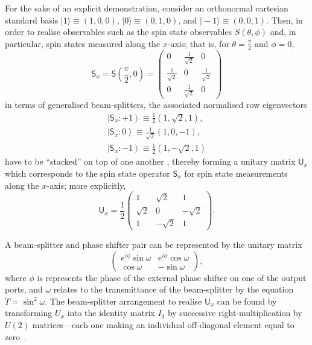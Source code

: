 \documentclass[%
 preprint,
 showpacs,
 showkeys,
 amsmath,
 amssymb,
 aps,
 pra,
 ]{revtex4-1}
\theoremstyle{definition}
\newcommand{\ket}[1]{\left| #1 \right>}
\begin{document}
For the sake of an explicit demonstration, consider an orthonormal cartesian standard basis
$\vert 1\rangle \equiv (1,0,0)$,
$\vert 0\rangle \equiv  (0,1,0)$, and
$\vert -1\rangle \equiv  (0,0,1)$.
Then, in order to realise observables such as the spin state observables
$S(\theta,\phi)$
and, in particular, spin states  measured along the $x$-axis;
that is, for $\theta = \frac{\pi}{2}$ and $\phi = 0$,
\begin{equation}
\textsf{S}_x   =
\textsf{S}\left(\frac{\pi}{2},0 \right)
=
\left(
\begin{array}{ccc}
 0 & \frac{1}{\sqrt{2}} & 0 \\
 \frac{1}{\sqrt{2}} & 0 & \frac{1}{\sqrt{2}} \\
 0 & \frac{1}{\sqrt{2}} & 0
\end{array}
\right)
\end{equation}
in terms of generalised beam-splitters, the
associated normalised row eigenvectors
\begin{equation}
\begin{array}{l}
 \ket{\textsf{S}_x : +1} \equiv  \frac{1}{2}\left(1,\sqrt{2},1\right),\\
 \ket{\textsf{S}_x : 0} \equiv  \frac{1}{\sqrt{2}}\left(1,0,-1\right),\\
 \ket{\textsf{S}_x : -1} \equiv  \frac{1}{2}\left(1,-\sqrt{2},1\right)
\end{array}
\end{equation}
have to be ``stacked'' on top of one another \cite{rzbb}, thereby forming a unitary matrix $\textsf{U}_x $
which corresponds to the spin state operator $\textsf{S}_x$ for spin state measurements along the $x$-axis;
more explicitly,
\begin{equation}
\textsf{U}_x
=
\frac{1}{2}
\left(
\begin{array}{cccc}
1&\sqrt{2}&1\\
\sqrt{2}&0&-\sqrt{2}\\
1&-\sqrt{2}&1
\end{array}
\right).
\end{equation}

A beam-splitter and phase shifter pair can be represented by the unitary matrix
\begin{equation}
	\begin{pmatrix}
e^{i\phi}\sin\omega & e^{i \phi}\cos\omega\\
\cos\omega & -\sin\omega
\end{pmatrix},
\end{equation}
where $\phi$ is represents the phase of the external phase shifter on one of the output ports, and $\omega$ relates to the transmittance of the beam-splitter by the equation $T=\sin^2\omega$.
The beam-splitter arrangement to realise $\textsf{U}_x$ can be found by transforming $U_x$ into the identity matrix $I_3$ by successive right-multiplication by $U(2)$ matrices---each one making an individual off-diagonal element equal to zero~\cite{rzbb}.
\end{document}
